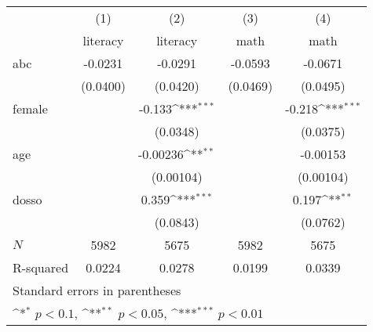 {
\def\sym#1{\ifmmode^{#1}\else\(^{#1}\)\fi}
\begin{tabular}{l*{4}{c}}
\toprule
            &\multicolumn{1}{c}{(1)}&\multicolumn{1}{c}{(2)}&\multicolumn{1}{c}{(3)}&\multicolumn{1}{c}{(4)}\\
            &\multicolumn{1}{c}{literacy}&\multicolumn{1}{c}{literacy}&\multicolumn{1}{c}{math}&\multicolumn{1}{c}{math}\\
\midrule
abc         &     -0.0231         &     -0.0291         &     -0.0593         &     -0.0671         \\
            &    (0.0400)         &    (0.0420)         &    (0.0469)         &    (0.0495)         \\
\addlinespace
female      &                     &      -0.133\sym{***}&                     &      -0.218\sym{***}\\
            &                     &    (0.0348)         &                     &    (0.0375)         \\
\addlinespace
age         &                     &    -0.00236\sym{**} &                     &    -0.00153         \\
            &                     &   (0.00104)         &                     &   (0.00104)         \\
\addlinespace
dosso       &                     &       0.359\sym{***}&                     &       0.197\sym{**} \\
            &                     &    (0.0843)         &                     &    (0.0762)         \\
\midrule
\(N\)       &        5982         &        5675         &        5982         &        5675         \\
R-squared   &      0.0224         &      0.0278         &      0.0199         &      0.0339         \\
\bottomrule
\multicolumn{5}{l}{\footnotesize Standard errors in parentheses}\\
\multicolumn{5}{l}{\footnotesize \sym{*} \(p<0.1\), \sym{**} \(p<0.05\), \sym{***} \(p<0.01\)}\\
\end{tabular}
}
